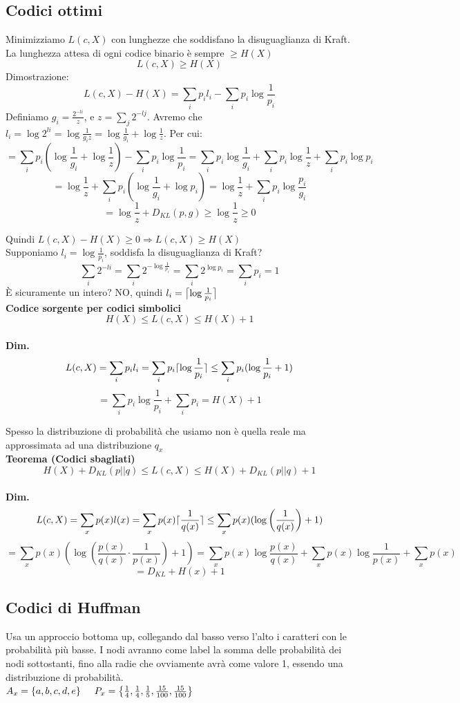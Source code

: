 \documentclass{report}
\DeclarePairedDelimiter{\ceil}{\lceil}{\rceil}
\begin{document}
\subsection{Codici ottimi}
Minimizziamo $L(c,X)$ con lunghezze che soddisfano la disuguaglianza di Kraft. La lunghezza attesa di ogni codice binario è sempre $\ge H(X)$
$$L(c,X)\ge H(X)$$
Dimostrazione: $$L(c,X)-H(X)= \sum_i p_i l_i- \sum_i p_i\log \frac{1}{p_i}$$
Definiamo $g_i = \frac{2^{-li}}{z}$, e $z = \sum_j 2^{-lj}$. Avremo che $l_i = \log2^{li} = \log\frac{1}{g_iz}= \log\frac{1}{g_i}+ \log\frac{1}{z}$. Per cui:
$$=\sum_i p_i (\log\frac{1}{g_i}+\log\frac{1}{z}) - \sum_i p_i \log\frac{1}{p_i} =\sum_i p_i \log\frac{1}{g_i} +\sum_ip_i\log\frac{1}{z} + \sum_i p_i \log p_i$$
$$= \log \frac{1}{z}+ \sum_i p_i (\log\frac{1}{g_i}+\log p_i) = \log\frac{1}{z} + \sum_i p_i\log\frac{p_i}{g_i} $$$$= \log\frac{1}{z} + D_{KL}(p,g)\ge \log\frac{1}{z}\ge0$$

Quindi $L(c,X)-H(X)\ge0\Rightarrow L(c,X)\ge H(X)$
\\Supponiamo $l_i = \log \frac{1}{p_i}$, soddisfa la disuguaglianza di Kraft?
$$\sum_i 2^{-li}=\sum_i2^{-\log\frac{1}{p_i}}= \sum_i2^{\log p_i}=\sum_i p_i = 1$$
È sicuramente un intero? NO, quindi $l_i = \ceil[\big]{\log\frac{1}{p_i}} $
\medskip
\\ \textbf{Codice sorgente per codici simbolici}
$$H(X)\le L(c,X)\le H(X)+1$$
\\ \textbf{Dim.}
$$L(c,X)= \sum_ip_il_i=\sum_i p_i\ceil{\log \frac{1}{p_i}} \le \sum_ip_i(\log\frac{1}{p_i} + 1)$$
$$ = \sum_ip_i\log \frac{1}{p_i}+\sum_ip_i = H(X)+1 $$

Spesso la distribuzione di probabilità che usiamo non è quella reale ma approssimata ad una distribuzione $q_x$
\medskip
\\ \textbf{Teorema (Codici sbagliati)}
$$H(X)+D_{KL}(p||q)\le L(c,X)\le H(X)+D_{KL}(p||q)+1$$
\\ \textbf{Dim.}
$$
    L(c,X)=\sum_x p(x)l(x) = \sum_x p(x) \ceil{\frac{1}{q(x)}} \le \sum_x p(x)(\log\left(\frac{1}{q(x)}\right)+1)
$$
$$
    = \sum_x p(x)(\log\left(\frac{p(x)}{q(x)}\cdot\frac{1}{p(x)}\right)+1)= \sum_x p(x)\log\frac{p(x)}{q(x)}+\sum_x p(x)\log\frac{1}{p(x)}+\sum_x p(x)
$$
$$ = D_{KL}+H(x) + 1$$

\subsection{Codici di Huffman}
Usa un approccio bottoma up, collegando dal basso verso l'alto i caratteri con le probabilità più basse. I nodi avranno come label la somma delle probabilità dei nodi sottostanti, fino alla radie che ovviamente avrà come valore 1, essendo una distribuzione di probabilità.
\medskip
\\$A_x = \{a,b,c,d,e\} \hspace{0.5cm} P_x = \left\{ \frac{1}{4}, \frac{1}{4}, \frac{1}{5}, \frac{15}{100}, \frac{15}{100} \right \}$
\end{document}
